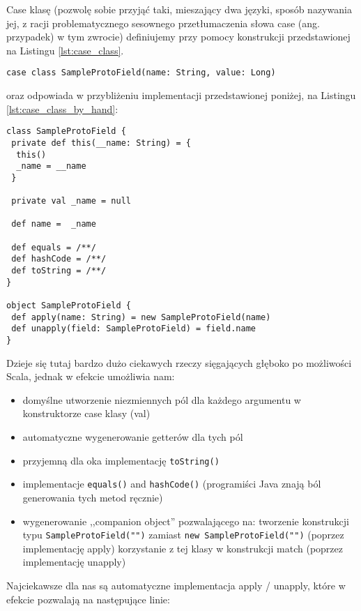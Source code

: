 Case klasę \small{(pozwolę sobie przyjąć taki, mieszający dwa języki, sposób nazywania jej, z racji problematycznego sesownego przetłumaczenia słowa case 
(ang. przypadek) w tym zwrocie)} definiujemy przy pomocy konstrukcji przedstawionej na Listingu \ref{lst:case_class}.

\begin{lstlisting}[caption={Deklaracja case klasy},label={lst:case_class}]
case class SampleProtoField(name: String, value: Long)
\end{lstlisting}

oraz odpowiada w przybliżeniu implementacji przedstawionej poniżej, na Listingu \ref{lst:case_class_by_hand}:

\begin{lstlisting}[caption={Ręczna implementacja case classy},label={lst:case_class_by_hand}]
class SampleProtoField {
 private def this(__name: String) = {
  this()
  _name = __name
 }

 private val _name = null

 def name =  _name

 def equals = /**/
 def hashCode = /**/
 def toString = /**/
}

object SampleProtoField {
 def apply(name: String) = new SampleProtoField(name)
 def unapply(field: SampleProtoField) = field.name
}
\end{lstlisting}

Dzieje się tutaj bardzo dużo ciekawych rzeczy sięgających głęboko po możliwości Scala, jednak w efekcie umożliwia nam:
\begin{itemize}
 \item domyślne utworzenie niezmiennych pól dla każdego argumentu w konstruktorze case klasy (val)
 \item automatyczne wygenerowanie getterów dla tych pól
 \item przyjemną dla oka implementację \verb|toString()|
 \item implementacje \verb|equals()| and \verb|hashCode()| (programiści Java znają ból generowania tych metod ręcznie)
 \item wygenerowanie ,,companion object'' pozwalającego na:
 \subitem tworzenie konstrukcji typu \verb|SampleProtoField("")| zamiast \verb|new SampleProtoField("")| (poprzez implementację apply)
 \subitem korzystanie z tej klasy w konstrukcji match (poprzez implementację unapply)
\end{itemize}

Najciekawsze dla nas są automatyczne implementacja apply / unapply, które w efekcie pozwalają na następujące linie:

